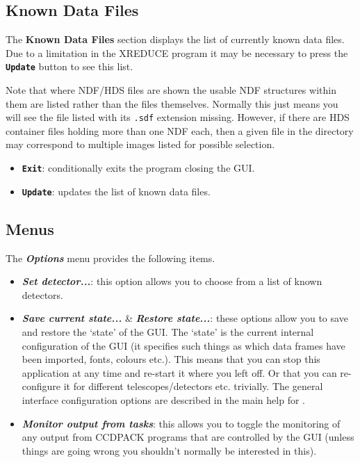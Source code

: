 \documentclass[11pt,nolof]{starlink}
\providecommand{\butt}[1]{{\bf \tt #1}}
\providecommand{\menu}[1]{{\bf \em #1}}
\providecommand{\wlab}[1]{{\bf #1}}
\providecommand{\text}[1]{{\tt #1}}
\begin{document}
\subsection{Known Data Files }
The \wlab{Known Data Files} section displays the list of currently
known data files. Due to a limitation in the XREDUCE program it may be
necessary to press the \butt{Update} button to see this list.

Note that where NDF/HDS files are shown the usable NDF structures
within them are listed rather than the files themselves.
Normally this just means you will see the file listed
with its \text{.sdf} extension missing.  However, if there are HDS
container files holding more than one NDF each, then a given
file in the directory may correspond to multiple images listed
for possible selection.

\begin{itemize}
\item \butt{Exit}: conditionally exits the program closing the GUI.
\item \butt{Update}: updates the list of known data files.
\end{itemize}

\subsection{Menus  \label{CCDMainMenu}}
The \menu{Options} menu provides the following items.

\begin{itemize}
\item \menu{Set detector...}:
this option allows you to choose from a list of known detectors.

\item \menu{Save current state...} \& \menu{Restore state...}:
these options allow you to save and restore the `state' of the GUI.
The `state' is the current internal configuration of the GUI (it
specifies such things as which data frames have been imported, fonts,
colours etc.). This means that you can stop this application at any
time and re-start it where you left off. Or that you can re-configure
it for different telescopes/detectors etc. trivially.  The general
interface configuration options are described in the main help for
.

\item \menu{Monitor output from tasks}:
this allows you to toggle the monitoring of any output from CCDPACK
programs that are controlled by the GUI (unless things are going wrong
you shouldn't normally be interested in this).
\end{itemize}
\end{document}
